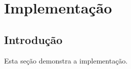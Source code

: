 \pagestyle{empty}
\cleardoublepage
\pagestyle{fancy}

\chapter{Implementação}\label{cap5}

\section{Introdução}\label{cap5:intro}

Esta seção demonstra a implementação.




